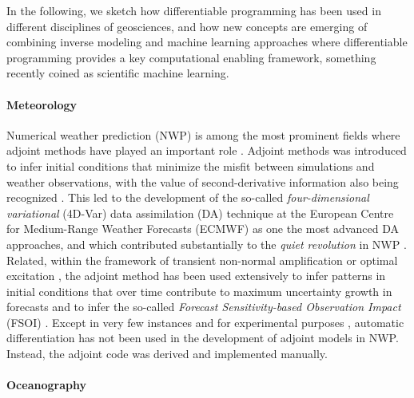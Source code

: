 In the following, we sketch how differentiable programming has been used in different disciplines of geosciences, and how new concepts are emerging of combining inverse modeling and machine learning approaches where differentiable programming provides a key computational enabling framework, something recently coined as scientific machine learning. 

\paragraph{Meteorology}

Numerical weather prediction (NWP) is among the most prominent fields where adjoint methods have played an important role \cite{Errico_1997}. 
Adjoint methods was introduced to infer initial conditions that minimize the misfit between simulations and weather observations\cite{Talagrand.1987,Courtier.1987}, with the value of second-derivative information also being recognized \cite{Dimet.2002}. 
This led to the development of the so-called \textit{four-dimensional variational} (4D-Var) data assimilation (DA) technique \cite{Rabier.1992,Rabier:2000uu} at the European Centre for Medium-Range Weather Forecasts (ECMWF) as one the most advanced DA approaches, and which contributed substantially to the \textit{quiet revolution} in NWP \cite{Bauer.2015}.
Related, within the framework of transient non-normal amplification or optimal excitation \cite{Farrell.1988,Farrell:1996jx}, the adjoint method has been used extensively to infer patterns in initial conditions that over time contribute to maximum uncertainty growth in forecasts \cite{Palmer:1994br,Buizza:1995in} and to infer the so-called \textit{Forecast Sensitivity-based Observation Impact} (FSOI) \cite{Langland:2004jo}.
Except in very few instances and for experimental purposes \cite{Giering.2006}, automatic differentiation has not been used in the development of adjoint models in NWP.
Instead, the adjoint code was derived and implemented manually.

\paragraph{Oceanography}

